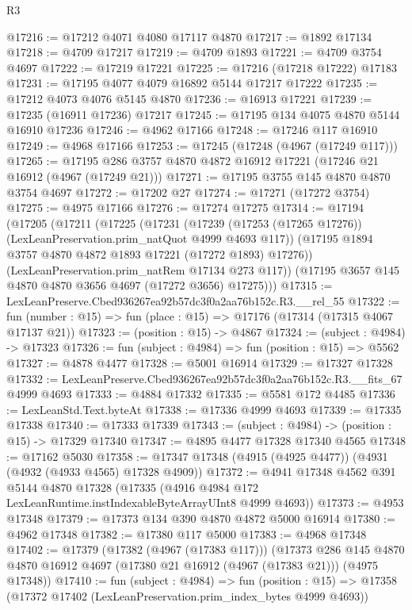 \begin{lexlean}{R3}
\begin{coremodule}
@17216 := @17212 @4071 @4080 @17117 @4870
@17217 := @1892 @17134
@17218 := @4709 @17217
@17219 := @4709 @1893
@17221 := @4709 @3754 @4697
@17222 := @17219 @17221
@17225 := @17216 (@17218 @17222) @17183
@17231 := @17195 @4077 @4079 @16892 @5144 @17217 @17222
@17235 := @17212 @4073 @4076 @5145 @4870
@17236 := @16913 @17221
@17239 := @17235 (@16911 @17236) @17217
@17245 := @17195 @134 @4075 @4870 @5144 @16910 @17236
@17246 := @4962 @17166
@17248 := @17246 @117 @16910
@17249 := @4968 @17166
@17253 := @17245 (@17248 (@4967 (@17249 @117)))
@17265 := @17195 @286 @3757 @4870 @4872 @16912 @17221 (@17246 @21 @16912 (@4967 (@17249 @21)))
@17271 := @17195 @3755 @145 @4870 @4870 @3754 @4697
@17272 := @17202 @27
@17274 := @17271 (@17272 @3754)
@17275 := @4975 @17166
@17276 := @17274 @17275
@17314 := @17194
    (@17205
      (@17211
        (@17225
          (@17231
            (@17239 (@17253 (@17265 @17276)) (LexLeanPreservation.prim_natQuot @4999 @4693 @117))
            (@17195 @1894 @3757 @4870 @4872 @1893 @17221 (@17272 @1893) @17276))
          (LexLeanPreservation.prim_natRem @17134 @273 @117))
        (@17195 @3657 @145 @4870 @4870 @3656 @4697 (@17272 @3656) @17275)))
@17315 := LexLeanPreserve.Cbed936267ea92b57dc3f0a2aa76b152c.R3.__rel_55
@17322 := fun (number : @15) => fun (place : @15) => @17176 (@17314 (@17315 @4067 @17137 @21))
@17323 := (position : @15) -> @4867
@17324 := (subject : @4984) -> @17323
@17326 := fun (subject : @4984) => fun (position : @15) => @5562
@17327 := @4878 @4477
@17328 := @5001 @16914
@17329 := @17327 @17328
@17332 := LexLeanPreserve.Cbed936267ea92b57dc3f0a2aa76b152c.R3.__fits_67 @4999 @4693
@17333 := @4884 @17332
@17335 := @5581 @172 @4485
@17336 := LexLeanStd.Text.byteAt
@17338 := @17336 @4999 @4693
@17339 := @17335 @17338
@17340 := @17333 @17339
@17343 := (subject : @4984) -> (position : @15) -> @17329 @17340
@17347 := @4895 @4477 @17328 @17340 @4565
@17348 := @17162 @5030
@17358 := @17347 @17348 (@4915 (@4925 @4477)) (@4931 (@4932 (@4933 @4565) @17328 @4909))
@17372 := @4941
    @17348
    @4562
    @391
    @5144
    @4870
    @17328
    (@17335 (@4916 @4984 @172 LexLeanRuntime.instIndexableByteArrayUInt8 @4999 @4693))
@17373 := @4953 @17348
@17379 := @17373 @134 @390 @4870 @4872 @5000 @16914
@17380 := @4962 @17348
@17382 := @17380 @117 @5000
@17383 := @4968 @17348
@17402 := @17379
    (@17382 (@4967 (@17383 @117)))
    (@17373
      @286
      @145
      @4870
      @4870
      @16912
      @4697
      (@17380 @21 @16912 (@4967 (@17383 @21)))
      (@4975 @17348))
@17410 := fun (subject : @4984) =>
  fun (position : @15) => @17358 (@17372 @17402 (LexLeanPreservation.prim_index_bytes @4999 @4693))

\end{coremodule}
\end{lexlean}
